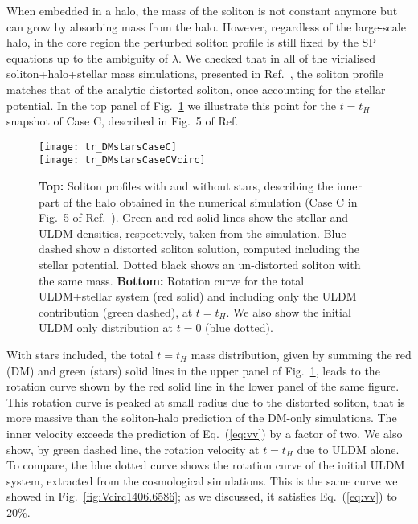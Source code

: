 \documentclass[aps,prd,floats,superscriptaddress,showpacs,nofootinbib,twocolumn,preprintnumbers]{revtex4-1}%
\begin{document}
When embedded in a halo, the mass of the soliton is not constant
anymore but can grow by absorbing mass from the halo. However,
regardless of the large-scale halo, in the core region the perturbed
soliton profile is still fixed by the SP equations up to the ambiguity
of $\lambda$. We checked that in all of the virialised
soliton+halo+stellar mass simulations, presented in
Ref.~\cite{2017arXiv171201947C}, the soliton profile matches that of
the analytic distorted soliton, once accounting for the stellar
potential.  
In the top panel of Fig.~\ref{fig:DMstarsCaseC} we illustrate this
point for the $t=t_H$ snapshot of Case C, described in Fig.~5 of
Ref.~\cite{2017arXiv171201947C} 
%
\begin{figure}[hbp!]
\centering
\texttt{[image: tr\_DMstarsCaseC]}
\\
\vspace{10pt}
\texttt{[image: tr\_DMstarsCaseCVcirc]}
\caption{
{\bf Top:} Soliton profiles with and without stars, describing the
inner part of the halo obtained in the numerical simulation (Case C
in Fig.~5 of 
Ref.~\cite{2017arXiv171201947C}). Green and red solid lines show the
stellar and ULDM densities, respectively, taken from the
simulation. Blue dashed show a distorted soliton solution, computed
including the stellar potential. Dotted black shows an un-distorted
soliton with the same mass. {\bf Bottom:} Rotation curve for the total
ULDM+stellar system (red solid) and including only the ULDM contribution (green dashed), at $t=t_H$. We also show the initial ULDM only
distribution at $t=0$ (blue dotted). 
}\label{fig:DMstarsCaseC}
\end{figure}
%

With stars included, the total $t=t_H$ mass distribution, given by
summing the red (DM) and green (stars) solid lines in the upper panel
of Fig.~\ref{fig:DMstarsCaseC}, leads to the rotation curve shown by
the red solid line in the lower panel of the same figure. This
rotation curve is peaked at small radius due to the distorted soliton,
that is more massive than the soliton-halo prediction of the
DM-only simulations. The inner velocity exceeds the prediction of
Eq.~(\ref{eq:vv}) by a factor of two. We also show, by green dashed line, the rotation velocity at $t=t_H$ due to ULDM alone. To compare, the blue dotted
curve shows the rotation curve of the initial ULDM system, extracted
from the cosmological simulations. This is the same curve we showed in
Fig.~\ref{fig:Vcirc1406.6586}; as we discussed,
it satisfies Eq.~(\ref{eq:vv}) to $20\%$.   
\end{document}
